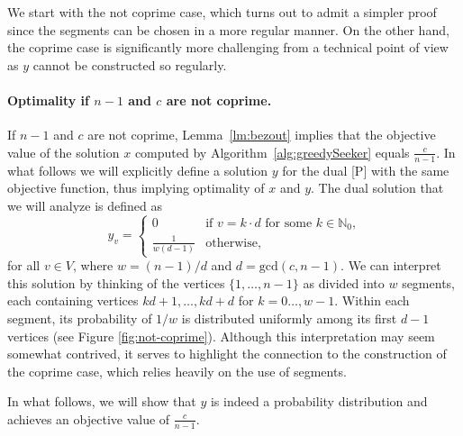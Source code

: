 \documentclass[11pt]{article}
\newcommand\+{\mkern2mu}
\begin{document}
We start with the not coprime case, which turns out to admit a simpler proof since the segments can be chosen in a more regular manner. On the other hand, the coprime case is significantly more challenging from a technical point of view as $y$ cannot be constructed so regularly.

\paragraph*{Optimality if $n-1$ and $c$ are not coprime.}

If $n-1$ and $c$ are not coprime, Lemma~\ref{lm:bezout} implies that the objective value of the solution $x$ computed by Algorithm~\ref{alg:greedySeeker} equals $\frac{c}{n-1}$. In what follows we will explicitly define a solution $y$ for the dual [P] with the same objective function, thus implying optimality of $x$ and $y$. The dual solution that we will analyze is defined as
\begin{equation}\label{eq:yCoprime}
    y_v = \begin{cases}
        0 & \text{if $v=k\cdot d$ for some $k\in \mathbb{N}_0$,}\\
        \frac{1}{w(d-1)} & \text{otherwise,} 
    \end{cases}
\end{equation}
for all $v\in V$, where $w = (n-1) / d$ and $d=\text{gcd}(c,n-1)$. We can interpret this solution by thinking of the vertices $\{1, \ldots, n-1\}$ as divided into $w$ segments, each containing vertices $kd+1, \ldots, kd+d$ for $k=0 \ldots, w-1$. Within each segment, its probability of $1/w$ is distributed uniformly among its first $d-1$ vertices (see Figure \ref{fig:not-coprime}). Although this interpretation may seem somewhat contrived, it serves to highlight the connection to the construction of the coprime case, which relies heavily on the use of segments.

In what follows, we will show that $y$ is indeed a probability distribution and achieves an objective value of $\frac{c}{n-1}$. 
\end{document}
